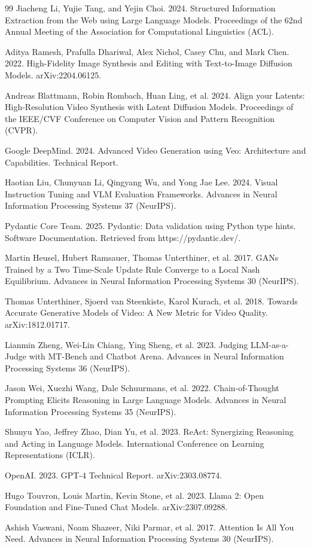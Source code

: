 \documentclass[sigconf,authordraft]{acmart}
\begin{document}
\begin{thebibliography}{99}
Jiacheng Li, Yujie Tang, and Yejin Choi. 2024. Structured Information Extraction from the Web using Large Language Models. Proceedings of the 62nd Annual Meeting of the Association for Computational Linguistics (ACL).

Aditya Ramesh, Prafulla Dhariwal, Alex Nichol, Casey Chu, and Mark Chen. 2022. High-Fidelity Image Synthesis and Editing with Text-to-Image Diffusion Models. arXiv:2204.06125.

Andreas Blattmann, Robin Rombach, Huan Ling, et al. 2024. Align your Latents: High-Resolution Video Synthesis with Latent Diffusion Models. Proceedings of the IEEE/CVF Conference on Computer Vision and Pattern Recognition (CVPR).

Google DeepMind. 2024. Advanced Video Generation using Veo: Architecture and Capabilities. Technical Report.

Haotian Liu, Chunyuan Li, Qingyang Wu, and Yong Jae Lee. 2024. Visual Instruction Tuning and VLM Evaluation Frameworks. Advances in Neural Information Processing Systems 37 (NeurIPS).

Pydantic Core Team. 2025. Pydantic: Data validation using Python type hints. Software Documentation. Retrieved from https://pydantic.dev/.

Martin Heusel, Hubert Ramsauer, Thomas Unterthiner, et al. 2017. GANs Trained by a Two Time-Scale Update Rule Converge to a Local Nash Equilibrium. Advances in Neural Information Processing Systems 30 (NeurIPS).

Thomas Unterthiner, Sjoerd van Steenkiste, Karol Kurach, et al. 2018. Towards Accurate Generative Models of Video: A New Metric for Video Quality. arXiv:1812.01717.

Lianmin Zheng, Wei-Lin Chiang, Ying Sheng, et al. 2023. Judging LLM-as-a-Judge with MT-Bench and Chatbot Arena. Advances in Neural Information Processing Systems 36 (NeurIPS).

Jason Wei, Xuezhi Wang, Dale Schuurmans, et al. 2022. Chain-of-Thought Prompting Elicits Reasoning in Large Language Models. Advances in Neural Information Processing Systems 35 (NeurIPS).

Shunyu Yao, Jeffrey Zhao, Dian Yu, et al. 2023. ReAct: Synergizing Reasoning and Acting in Language Models. International Conference on Learning Representations (ICLR).

OpenAI. 2023. GPT-4 Technical Report. arXiv:2303.08774.

Hugo Touvron, Louis Martin, Kevin Stone, et al. 2023. Llama 2: Open Foundation and Fine-Tuned Chat Models. arXiv:2307.09288.

Ashish Vaswani, Noam Shazeer, Niki Parmar, et al. 2017. Attention Is All You Need. Advances in Neural Information Processing Systems 30 (NeurIPS).

\end{thebibliography}
\end{document}

